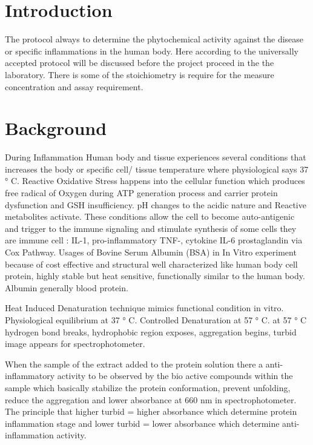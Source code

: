\documentclass{comjnl}
\begin{document}
\maketitle


\section{Introduction}
The protocol always to determine the phytochemical activity against the disease or specific inflammations in the human body. 
Here according to the universally accepted protocol will be discussed before the project proceed in the the laboratory.
There is some of the stoichiometry is require for the measure concentration and assay requirement.

\section{Background}
During Inflammation Human body and tissue experiences several conditions that increases the body or specific cell/ tissue temperature where physiological says 37 \unit{\degree} C. Reactive Oxidative Stress happens into the cellular function which produces free radical of Oxygen during ATP generation process and carrier protein dysfunction and GSH insufficiency. pH changes to  the acidic nature and Reactive metabolites activate.
These conditions allow the cell to become auto-antigenic and trigger to the immune signaling and stimulate synthesis of some cells they are immune cell : IL-1\unit{\beta}, pro-inflammatory TNF-\unit{\alpha}, cytokine IL-6 prostaglandin via Cox Pathway.
Usages of Bovine Serum Albumin (BSA) in In Vitro experiment because of cost effective and structural well characterized like human body cell protein, highly stable but heat sensitive, functionally similar to the human body. Albumin generally blood protein. 

Heat Induced Denaturation technique mimics functional condition in vitro.
Physiological equilibrium at 37 \unit{\degree} C.  
Controlled Denaturation at 57 \unit{\degree} C. at 57 \unit{\degree} C hydrogen bond breaks, hydrophobic region exposes,  aggregation begins, turbid image appears for spectrophotometer.

When the sample of the extract added to the protein solution there a anti-inflammatory activity to be observed by the bio active compounds within the sample which basically stabilize the protein conformation, prevent unfolding, reduce the aggregation and lower absorbance at 660 nm in spectrophotometer. The principle that higher turbid = higher absorbance which determine protein inflammation stage and lower turbid = lower absorbance which determine anti-inflammation activity.
\end{document}
